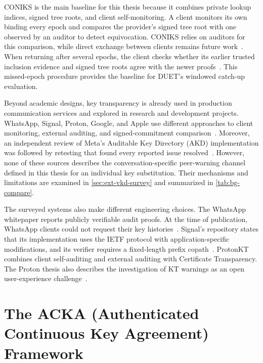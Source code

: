 CONIKS is the main baseline for this thesis because it combines private lookup indices, signed tree
roots, and client self-monitoring. A client monitors its own binding every epoch and compares the
provider's signed tree root with one observed by an auditor to detect equivocation. CONIKS relies on
auditors for this comparison, while direct exchange between clients remains future
work~\cite[Sections~3.2--3.4 and~4.1.3--4.1.4, including footnote~5]{melara2015coniks}.
When returning after several epochs, the client checks whether its earlier trusted inclusion
evidence and signed tree roots agree with the newer
proofs~\cite[Section~4.2]{melara2015coniks}. This missed-epoch procedure provides the baseline for
DUET's windowed catch-up evaluation.

Beyond academic designs, key transparency is already used in production communication services and
explored in research and development projects. WhatsApp, Signal, Proton, Google, and Apple use
different approaches to client monitoring, external auditing, and signed-commitment
comparison~\cite{whatsapp2023whitepaper,signal-kt-server,goebel2023proton,google-kt,apple-ckv}.
Moreover, an independent review of Meta's Auditable Key Directory (AKD) implementation was followed
by retesting that found every reported issue resolved~\cite{nccgroup2023akd}. However, none of these
sources describes the conversation-specific peer-warning channel defined in this thesis for an
individual key substitution. Their mechanisms and limitations are examined in
\cref{sec:ext-vkd-survey} and summarized in \cref{tab:bg-compare}.

The surveyed systems also make different engineering choices. The WhatsApp whitepaper reports
publicly verifiable audit proofs. At the time of publication, WhatsApp clients could not request
their key histories~\cite{whatsapp2023whitepaper}. Signal's repository states that its
implementation uses the IETF protocol with application-specific modifications, and its verifier
requires a fixed-length prefix copath~\cite{signal-kt-server}. ProtonKT combines client
self-auditing and external auditing with Certificate Transparency. The Proton thesis also describes
the investigation of KT warnings as an open user-experience
challenge~\cite{goebel2023proton}.

\section{The ACKA (Authenticated Continuous Key Agreement) Framework}\label{sec:bg-acka}

